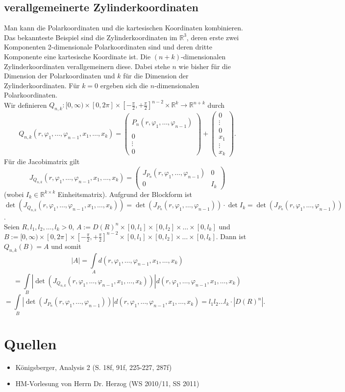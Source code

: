 \documentclass[a4paper,11pt]{scrartcl}
\newcommand{\R}{{\ensuremath{\mathbb{R}}}}
\begin{document}
\subsection{verallgemeinerte Zylinderkoordinaten}
Man kann die Polarkoordinaten und die kartesischen Koordinaten kombinieren. Das bekannteste Beispiel sind die Zylinderkoordinaten im $\R^3$, deren erste zwei Komponenten 2-dimensionale Polarkoordinaten sind und deren dritte Komponente eine kartesische Koordinate ist. Die $(n+k)$-dimensionalen Zylinderkoordinaten verallgemeinern diese. Dabei stehe $n$ wie bisher für die Dimension der Polarkoordinaten und $k$ für die Dimension der Zylinderkoordinaten. Für $k=0$ ergeben sich die $n$-dimensionalen Polarkoordinaten.\\
Wir definieren $Q_{n,k}:[0,\infty)\times[0, 2\pi]\times[-\frac{\pi}{2},+\frac{\pi}{2}]^{n-2}\times \R^k\to\R^{n+k}$ durch
$$Q_{n,k}(r,\varphi_1,\ldots,\varphi_{n-1}, x_1, \ldots, x_k)=
\begin{pmatrix} \\ P_n(r,\varphi_1,\ldots,\varphi_{n-1}) \\ \\ 0 \\ \vdots \\ 0 \end{pmatrix}
+ \begin{pmatrix} 0 \\ \vdots \\ 0 \\ x_1 \\ \vdots \\ x_k \end{pmatrix}.$$
Für die Jacobimatrix gilt $$J_{Q_{n,k}}(r,\varphi_1,\ldots,\varphi_{n-1}, x_1, \ldots, x_k)=\begin{pmatrix}
J_{P_n}(r,\varphi_1,\ldots,\varphi_{n-1}) & 0 \\ 0 & I_k
\end{pmatrix}$$
(wobei $I_k\in\R^{k\times k}$ Einheitsmatrix). Aufgrund der Blockform ist \\$\det (J_{Q_{n,k}}(r,\varphi_1,\ldots,\varphi_{n-1}, x_1, \ldots, x_k)) = \det (J_{P_n}(r,\varphi_1,\ldots,\varphi_{n-1}))\cdot \det I_k=\det (J_{P_n}(r,\varphi_1,\ldots,\varphi_{n-1}))$.\\
Seien $R,l_1,l_2,\ldots,l_k>0$, $A:=D(R)^n\times[0,l_1]\times[0,l_2]\times\ldots\times[0,l_k]$ und $B:=[0,\infty)\times[0, 2\pi]\times[-\frac{\pi}{2},+\frac{\pi}{2}]^{n-2}\times[0,l_1]\times[0,l_2]\times\ldots\times[0,l_k]$. Dann ist $Q_{n,k}(B)=A$ und somit
$$|A|=\int\limits_A d(r,\varphi_1,\ldots,\varphi_{n-1}, x_1, \ldots, x_k)$$
$$=\int\limits_B |\det (J_{Q_{n,k}}(r,\varphi_1,\ldots,\varphi_{n-1}, x_1, \ldots, x_k))| d(r,\varphi_1,\ldots,\varphi_{n-1}, x_1, \ldots, x_k)$$
$$ = \int\limits_B |\det (J_{P_n}(r,\varphi_1,\ldots,\varphi_{n-1}))| d(r,\varphi_1,\ldots,\varphi_{n-1}, x_1, \ldots, x_k) = l_1 l_2 \ldots l_k \cdot |D(R)^n|.$$
\section{Quellen}
\begin{itemize}
\item Königsberger, Analysis 2 (S. 18f, 91f, 225-227, 287f)
\item HM-Vorlesung von Herrn Dr. Herzog (WS 2010/11, SS 2011)
\end{itemize}
\end{document}
